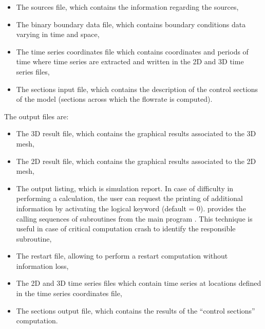 \begin{itemize}
\item The sources file, which contains the information regarding the sources,

\item The binary boundary data file, which contains boundary conditions data
varying in time and space,

\item The time series coordinates file which contains coordinates and periods of
time where time series are extracted and written in the 2D and 3D time series
files,

\item The sections input file, which contains the description of the control
sections of the model (sections across which the flowrate is computed).
\end{itemize}

The output files are:

\begin{itemize}
\item The 3D result file, which contains the graphical results associated to
the 3D mesh,

\item The 2D result file, which contains the graphical results associated to
the 2D mesh,

\item The output listing, which is simulation report. In case of difficulty in
performing a calculation, the user can request the printing of additional
information by activating the logical keyword  (default = 0).
 provides the calling sequences of subroutines from the
main program . This technique is useful in case of
critical computation crash to identify the responsible subroutine,

%
\item The restart file, allowing to perform a restart computation without
information loss,

\item The 2D and 3D time series files which contain time series at locations
defined in the time series coordinates file,

\item The sections output file, which contains the results of the
``control sections'' computation.
\end{itemize}

